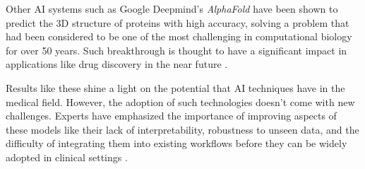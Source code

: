 \documentclass[../main.tex]{subfiles}
\begin{document}

    \begin{table}[h]
   \end{table}

    Other AI systems such as Google Deepmind's \textit{AlphaFold} \cite{yang_alphafold2_2023} have been shown to predict the 3D structure of proteins with high accuracy, solving a problem that had been considered to be one of the most challenging in computational biology for over 50 years. Such breakthrough is thought to have a significant impact in applications like drug discovery in the near future \cite{jumper_highly_2021}.
    
    Results like these shine a light on the potential that AI techniques have in the medical field. However, the adoption of such technologies doesn't come with new challenges. Experts have emphasized the importance of improving aspects of these models like their lack of interpretability, robustness to unseen data, and the difficulty of integrating them into existing workflows before they can be widely adopted in clinical settings \cite{esteva_deep_2021, topol_high-performance_2019}.
    
\end{document}
